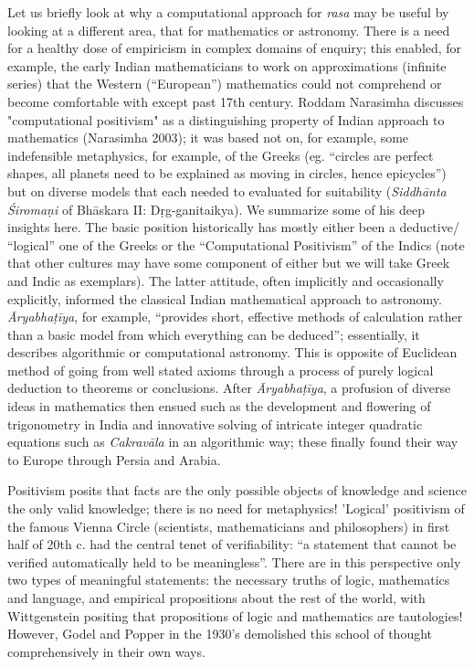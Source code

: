 Let us briefly look at why a computational approach for \textsl{rasa} may be useful by looking at a different area, that for mathematics or astronomy. There is a need for a healthy dose of empiricism in complex domains of enquiry; this enabled, for example, the early Indian mathematicians to work on approximations (infinite series) that the Western (“European”) mathematics could not comprehend or become comfortable with except past 17th century. Roddam Narasimha discusses "computational positivism" as a distinguishing property of Indian approach to mathematics (Narasimha 2003); it was based not on, for example, some indefensible metaphysics, for example, of the Greeks (eg. “circles are perfect shapes, all planets need to be explained as moving in circles, hence epicycles”) but on diverse models that each needed to evaluated for suitability (\textsl{Siddhānta Śiromaṇi} of Bhāskara II: Dṛg-ganitaikya). We summarize some of his deep insights here. The basic position historically has mostly either been a deductive/ “logical” one of the Greeks or the “Computational Positivism” of the Indics (note that other cultures may have some component of either but we will take Greek and Indic as exemplars). The latter attitude, often implicitly and occasionally explicitly, informed the classical Indian mathematical approach to astronomy. \textsl{Āryabhaṭīya}, for example, “provides short, effective methods of calculation rather than a basic model from which everything can be deduced”; essentially, it describes algorithmic or computational astronomy. This is opposite of Euclidean method of going from well stated axioms through a process of purely logical deduction to theorems or conclusions. After \textsl{Āryabhaṭīya}, a profusion of diverse ideas in mathematics then ensued such as the development and flowering of trigonometry in India and innovative solving of intricate integer quadratic equations such as \textsl{Cakravāla} in an algorithmic way; these finally found their way to Europe through Persia and Arabia.

Positivism posits that facts are the only possible objects of knowledge and science the only valid knowledge; there is no need for metaphysics! 'Logical' positivism of the famous Vienna Circle (scientists, mathematicians and philosophers) in first half of 20th c. had the central tenet of verifiability: “a statement that cannot be verified automatically held to be meaningless”. There are in this perspective only two types of meaningful statements: the necessary truths of logic, mathematics and language, and empirical propositions about the rest of the world, with Wittgenstein positing that propositions of logic and mathematics are tautologies! However, Godel and Popper in the 1930’s demolished this school of thought comprehensively in their own ways. 

